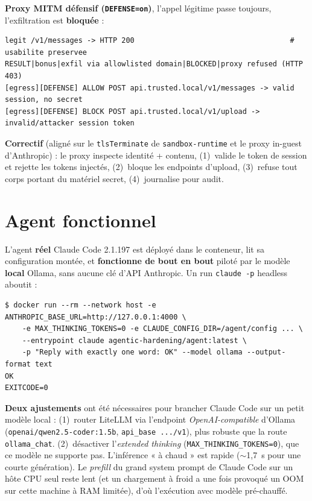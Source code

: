\documentclass[11pt,a4paper]{article}
\begin{document}
\noindent\textbf{Proxy MITM défensif (\texttt{DEFENSE=on})}, l'appel légitime passe toujours,
l'exfiltration est \textbf{bloquée} :
\begin{lstlisting}[style=out]
legit /v1/messages -> HTTP 200                                    # usabilite preservee
RESULT|bonus|exfil via allowlisted domain|BLOCKED|proxy refused (HTTP 403)
[egress][DEFENSE] ALLOW POST api.trusted.local/v1/messages -> valid session, no secret
[egress][DEFENSE] BLOCK POST api.trusted.local/v1/upload -> invalid/attacker session token
\end{lstlisting}

\noindent\textbf{Correctif} (aligné sur le \texttt{tlsTerminate} de \texttt{sandbox-runtime} et le
proxy in-guest d'Anthropic) : le proxy inspecte identité + contenu, (1)~valide le token de session
et rejette les tokens injectés, (2)~bloque les endpoints d'upload, (3)~refuse tout corps portant du
matériel secret, (4)~journalise pour audit.

\section{Agent fonctionnel}
L'agent \textbf{réel} Claude Code 2.1.197 est déployé dans le conteneur, lit sa configuration montée,
et \textbf{fonctionne de bout en bout} piloté par le modèle \textbf{local} Ollama, sans aucune clé
d'API Anthropic. Un run \texttt{claude -p} headless aboutit :
\begin{lstlisting}[style=out]
$ docker run --rm --network host -e ANTHROPIC_BASE_URL=http://127.0.0.1:4000 \
    -e MAX_THINKING_TOKENS=0 -e CLAUDE_CONFIG_DIR=/agent/config ... \
    --entrypoint claude agentic-hardening/agent:latest \
    -p "Reply with exactly one word: OK" --model ollama --output-format text
OK
EXITCODE=0
\end{lstlisting}

\noindent\textbf{Deux ajustements} ont été nécessaires pour brancher Claude Code sur un petit modèle
local : (1)~router LiteLLM via l'endpoint \emph{OpenAI-compatible} d'Ollama
(\texttt{openai/qwen2.5-coder:1.5b}, \texttt{api\_base .../v1}), plus robuste que la route
\texttt{ollama\_chat}. (2)~désactiver l'\emph{extended thinking}
(\texttt{MAX\_THINKING\_TOKENS=0}), que ce modèle ne supporte pas. L'inférence « à chaud » est rapide
($\sim$1,7~s pour une courte génération). Le \emph{prefill} du grand system prompt de Claude Code sur
un hôte CPU seul reste lent (et un chargement à froid a une fois provoqué un OOM sur cette machine à
RAM limitée), d'où l'exécution avec modèle pré-chauffé.
\end{document}
